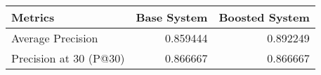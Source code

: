 \begin{tabular}{lrr}
\toprule
               Metrics &  Base System &  Boosted System \\
\midrule
     Average Precision &     0.859444 &        0.892249 \\
Precision at 30 (P@30) &     0.866667 &        0.866667 \\
\bottomrule
\end{tabular}
